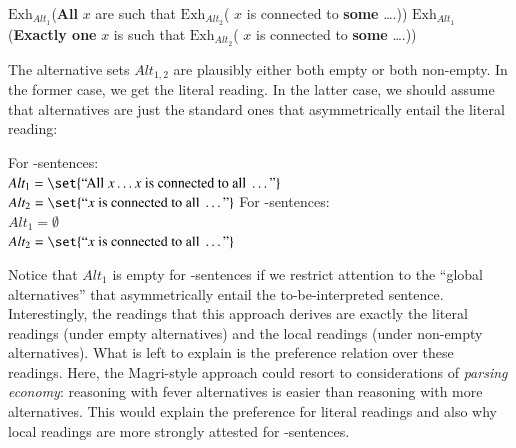 \documentclass[fleqn,reqno,10pt]{article}
\newcommand{\as}{\acro{as}}
\renewcommand{\es}{\acro{es}}
\newcommand{\exh}{\ensuremath{\mathrm{Exh}}}
\renewcommand{\mymark}[1]{\textbf{#1}}
\begin{document}
\begin{exe}
  \ex \label{Magri-Parses}
    \begin{xlist}
    \ex \label{Magri-Parse-AS} \mymark{$\exh_{Alt_1}$}(\mymark{All} $x$ are such that \mymark{$\exh_{Alt_2}$}( $x$ is connected to
      \mymark{some}  \dots.))
    \ex \label{Magri-Parse-ES} \mymark{$\exh_{Alt_1}$}(\mymark{Exactly
        one} $x$  is such that \mymark{$\exh_{Alt_2}$}( $x$ is connected to \mymark{some}  \dots.))
    \end{xlist}
\end{exe}

\noindent The alternative sets $Alt_{1,2}$ are plausibly either both
empty or both non-empty. In the former case, we get the literal
reading. In the latter case, we should assume that alternatives are
just the standard ones that asymmetrically entail the literal reading:

\begin{exe}
  \ex \label{Magri-Alternatives} 
    \begin{xlist}
    \ex \label{Magri-Alternatives-AS} For \as-sentences: \\
      $Alt_1 = \set{\text{``All } x
          \dots x \text{ is connected to all } \dots \text{''}}$ \\
        $Alt_2 = \set{\text{``}x \text{ is connected to all } \dots
          \text{''}}$
    \ex \label{Magri-Alternatives-AS} For \es-sentences: \\
      $Alt_1 = \emptyset$ \\
        $Alt_2 = \set{\text{``}x \text{ is connected to all } \dots \text{''}}$
    \end{xlist}
\end{exe}  

\noindent Notice that $Alt_1$ is empty for \es-sentences if we
restrict attention to the ``global alternatives'' that asymmetrically
entail the to-be-interpreted sentence. Interestingly, the readings
that this approach derives are exactly the literal readings (under
empty alternatives) and the local readings (under non-empty
alternatives). What is left to explain is the preference relation over
these readings. Here, the Magri-style approach could resort to
considerations of \emph{parsing economy}: reasoning with fever
alternatives is easier than reasoning with more alternatives. This
would explain the preference for literal readings and also why local
readings are more strongly attested for \es-sentences.
\end{document}
